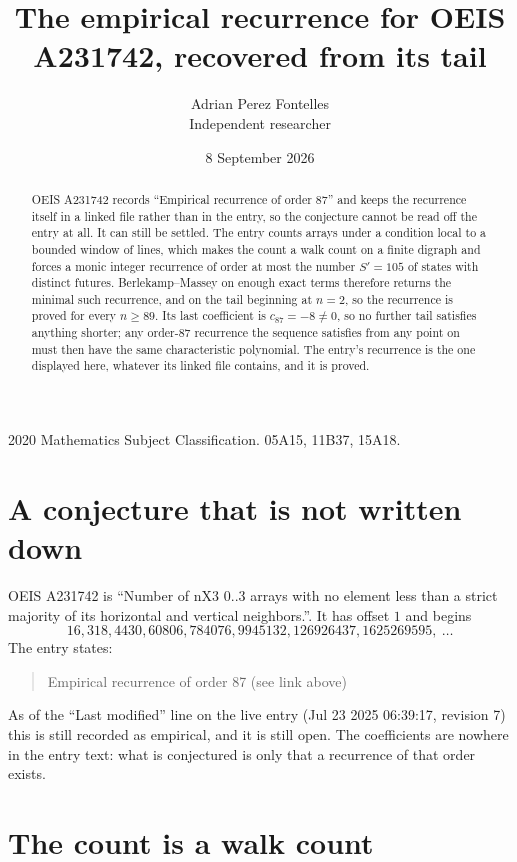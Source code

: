 \documentclass[11pt,a4paper]{article}
\title{The empirical recurrence for OEIS A231742, recovered from its tail}
\author{Adrian Perez Fontelles\\ \small Independent researcher}
\date{8 September 2026}
\theoremstyle{plain}
\theoremstyle{definition}
\begin{document}
\maketitle

\begin{abstract}
OEIS A231742 records ``Empirical recurrence of order $87$'' and keeps the recurrence itself in
a linked file rather than in the entry, so the conjecture cannot be read off the entry at all.
It can still be settled. The entry counts arrays under a condition local to a bounded window of
lines, which makes the count a walk count on a finite digraph and forces a monic integer
recurrence of order at most the number $S'=105$ of states with distinct futures. Berlekamp--Massey on
enough exact terms therefore returns the minimal such recurrence, and on the tail beginning at $n=2$, so the recurrence is proved for every $n\ge89$.
Its last coefficient is $c_{87}=-8\neq0$, so no further tail satisfies anything
shorter; any order-$87$ recurrence the sequence satisfies from any point on must then have
the same characteristic polynomial. The entry's recurrence is the one displayed here, whatever
its linked file contains, and it is proved.
\end{abstract}

\noindent\small 2020 Mathematics Subject Classification. 05A15, 11B37, 15A18.\normalsize

\section{A conjecture that is not written down}

OEIS A231742 is ``Number of nX3 0..3 arrays with no element less than a strict majority of its horizontal and vertical neighbors.''. It has offset $1$ and begins
\[
16, 318, 4430, 60806, 784076, 9945132, 126926437, 1625269595,\ \dots
\]
The entry states:
\begin{quote}
Empirical recurrence of order 87 (see link above)
\end{quote}
As of the ``Last modified'' line on the live entry (Jul 23 2025 06:39:17, revision 7)
this is still recorded as empirical, and it is still open. The coefficients are nowhere in the
entry text: what is conjectured is only that a recurrence of that order exists.

\section{The count is a walk count}
\end{document}
